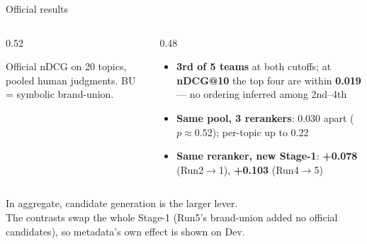 \documentclass[aspectratio=169,10pt]{beamer}
\begin{document}
\begin{frame}{Official results}
\begin{columns}[T]
\begin{column}{0.52\textwidth}
\footnotesize
{}
\smallskip

{\scriptsize Official nDCG on 20 topics, pooled human judgments. BU = symbolic brand-union.}
\end{column}
\begin{column}{0.48\textwidth}
\footnotesize
\begin{itemize}
  \item \textbf{3rd of 5 teams} at both cutoffs; at \textbf{nDCG@10} the top
        four are within \textbf{0.019} --- no ordering inferred among 2nd--4th
  \item \textbf{Same pool, 3 rerankers}: 0.030 apart ($p{\approx}0.52$);
        per-topic up to 0.22
  \item \textbf{Same reranker, new Stage-1}: \textbf{+0.078} (Run2$\to$1),
        \textbf{+0.103} (Run4$\to$5)
\end{itemize}
\end{column}
\end{columns}
\medskip
\begin{center}\color{accent}\small
In aggregate, candidate generation is the larger lever.\\
{\footnotesize The contrasts swap the whole Stage-1 (Run5's brand-union added no official
candidates), so metadata's own effect is shown on Dev.}
\end{center}
\end{frame}
\end{document}
